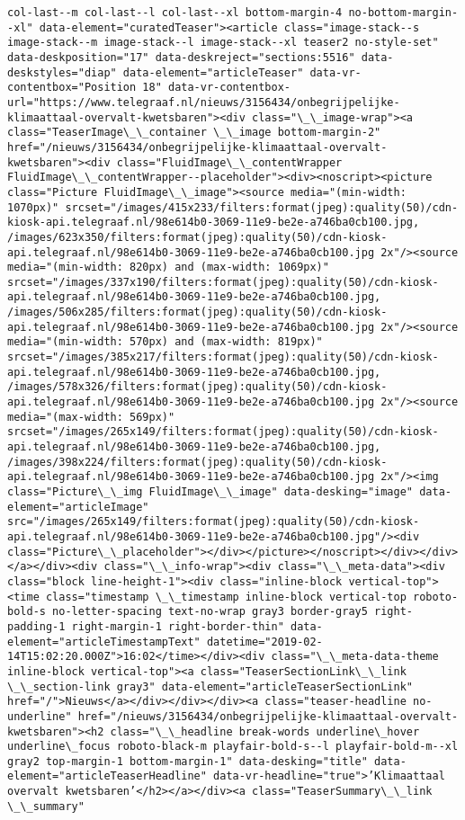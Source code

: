 \documentclass[11pt]{article}
\begin{document}
\begin{Verbatim}[commandchars=\\\{\}]
col-last--m col-last--l col-last--xl bottom-margin-4 no-bottom-margin--xl" data-element="curatedTeaser"><article class="image-stack--s image-stack--m image-stack--l image-stack--xl teaser2 no-style-set" data-deskposition="17" data-deskreject="sections:5516" data-deskstyles="diap" data-element="articleTeaser" data-vr-contentbox="Position 18" data-vr-contentbox-url="https://www.telegraaf.nl/nieuws/3156434/onbegrijpelijke-klimaattaal-overvalt-kwetsbaren"><div class="\_\_image-wrap"><a class="TeaserImage\_\_container \_\_image bottom-margin-2" href="/nieuws/3156434/onbegrijpelijke-klimaattaal-overvalt-kwetsbaren"><div class="FluidImage\_\_contentWrapper FluidImage\_\_contentWrapper--placeholder"><div><noscript><picture class="Picture FluidImage\_\_image"><source media="(min-width: 1070px)" srcset="/images/415x233/filters:format(jpeg):quality(50)/cdn-kiosk-api.telegraaf.nl/98e614b0-3069-11e9-be2e-a746ba0cb100.jpg, /images/623x350/filters:format(jpeg):quality(50)/cdn-kiosk-api.telegraaf.nl/98e614b0-3069-11e9-be2e-a746ba0cb100.jpg 2x"/><source media="(min-width: 820px) and (max-width: 1069px)" srcset="/images/337x190/filters:format(jpeg):quality(50)/cdn-kiosk-api.telegraaf.nl/98e614b0-3069-11e9-be2e-a746ba0cb100.jpg, /images/506x285/filters:format(jpeg):quality(50)/cdn-kiosk-api.telegraaf.nl/98e614b0-3069-11e9-be2e-a746ba0cb100.jpg 2x"/><source media="(min-width: 570px) and (max-width: 819px)" srcset="/images/385x217/filters:format(jpeg):quality(50)/cdn-kiosk-api.telegraaf.nl/98e614b0-3069-11e9-be2e-a746ba0cb100.jpg, /images/578x326/filters:format(jpeg):quality(50)/cdn-kiosk-api.telegraaf.nl/98e614b0-3069-11e9-be2e-a746ba0cb100.jpg 2x"/><source media="(max-width: 569px)" srcset="/images/265x149/filters:format(jpeg):quality(50)/cdn-kiosk-api.telegraaf.nl/98e614b0-3069-11e9-be2e-a746ba0cb100.jpg, /images/398x224/filters:format(jpeg):quality(50)/cdn-kiosk-api.telegraaf.nl/98e614b0-3069-11e9-be2e-a746ba0cb100.jpg 2x"/><img class="Picture\_\_img FluidImage\_\_image" data-desking="image" data-element="articleImage" src="/images/265x149/filters:format(jpeg):quality(50)/cdn-kiosk-api.telegraaf.nl/98e614b0-3069-11e9-be2e-a746ba0cb100.jpg"/><div class="Picture\_\_placeholder"></div></picture></noscript></div></div></a></div><div class="\_\_info-wrap"><div class="\_\_meta-data"><div class="block line-height-1"><div class="inline-block vertical-top"><time class="timestamp \_\_timestamp inline-block vertical-top roboto-bold-s no-letter-spacing text-no-wrap gray3 border-gray5 right-padding-1 right-margin-1 right-border-thin" data-element="articleTimestampText" datetime="2019-02-14T15:02:20.000Z">16:02</time></div><div class="\_\_meta-data-theme inline-block vertical-top"><a class="TeaserSectionLink\_\_link \_\_section-link gray3" data-element="articleTeaserSectionLink" href="/">Nieuws</a></div></div></div><a class="teaser-headline no-underline" href="/nieuws/3156434/onbegrijpelijke-klimaattaal-overvalt-kwetsbaren"><h2 class="\_\_headline break-words underline\_hover underline\_focus roboto-black-m playfair-bold-s--l playfair-bold-m--xl gray2 top-margin-1 bottom-margin-1" data-desking="title" data-element="articleTeaserHeadline" data-vr-headline="true">’Klimaattaal overvalt kwetsbaren’</h2></a></div><a class="TeaserSummary\_\_link \_\_summary" 
\end{Verbatim}
\end{document}

